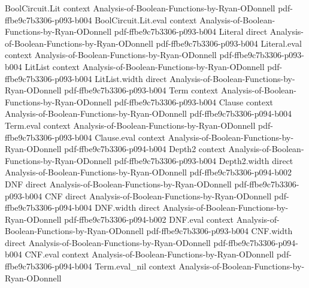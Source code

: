 \begin{lemma}
\label{BoolBLR.fourier_coeff_le_of_dist_ge_aux_h_lift_pm1}
\leanok
{}
\proofstep
  {BoolCircuit.Lit}
  {context}
  {Analysis-of-Boolean-Functions-by-Ryan-ODonnell}
  {pdf-ffbe9c7b3306-p093-b004}
\proofstep
  {BoolCircuit.Lit.eval}
  {context}
  {Analysis-of-Boolean-Functions-by-Ryan-ODonnell}
  {pdf-ffbe9c7b3306-p093-b004}
\proofstep
  {Literal}
  {direct}
  {Analysis-of-Boolean-Functions-by-Ryan-ODonnell}
  {pdf-ffbe9c7b3306-p093-b004}
\proofstep
  {Literal.eval}
  {context}
  {Analysis-of-Boolean-Functions-by-Ryan-ODonnell}
  {pdf-ffbe9c7b3306-p093-b004}
\proofstep
  {LitList}
  {context}
  {Analysis-of-Boolean-Functions-by-Ryan-ODonnell}
  {pdf-ffbe9c7b3306-p093-b004}
\proofstep
  {LitList.width}
  {direct}
  {Analysis-of-Boolean-Functions-by-Ryan-ODonnell}
  {pdf-ffbe9c7b3306-p093-b004}
\proofstep
  {Term}
  {context}
  {Analysis-of-Boolean-Functions-by-Ryan-ODonnell}
  {pdf-ffbe9c7b3306-p093-b004}
\proofstep
  {Clause}
  {context}
  {Analysis-of-Boolean-Functions-by-Ryan-ODonnell}
  {pdf-ffbe9c7b3306-p094-b004}
\proofstep
  {Term.eval}
  {context}
  {Analysis-of-Boolean-Functions-by-Ryan-ODonnell}
  {pdf-ffbe9c7b3306-p093-b004}
\proofstep
  {Clause.eval}
  {context}
  {Analysis-of-Boolean-Functions-by-Ryan-ODonnell}
  {pdf-ffbe9c7b3306-p094-b004}
\proofstep
  {Depth2}
  {context}
  {Analysis-of-Boolean-Functions-by-Ryan-ODonnell}
  {pdf-ffbe9c7b3306-p093-b004}
\proofstep
  {Depth2.width}
  {direct}
  {Analysis-of-Boolean-Functions-by-Ryan-ODonnell}
  {pdf-ffbe9c7b3306-p094-b002}
\proofstep
  {DNF}
  {direct}
  {Analysis-of-Boolean-Functions-by-Ryan-ODonnell}
  {pdf-ffbe9c7b3306-p093-b004}
\proofstep
  {CNF}
  {direct}
  {Analysis-of-Boolean-Functions-by-Ryan-ODonnell}
  {pdf-ffbe9c7b3306-p094-b004}
\proofstep
  {DNF.width}
  {direct}
  {Analysis-of-Boolean-Functions-by-Ryan-ODonnell}
  {pdf-ffbe9c7b3306-p094-b002}
\proofstep
  {DNF.eval}
  {context}
  {Analysis-of-Boolean-Functions-by-Ryan-ODonnell}
  {pdf-ffbe9c7b3306-p093-b004}
\proofstep
  {CNF.width}
  {direct}
  {Analysis-of-Boolean-Functions-by-Ryan-ODonnell}
  {pdf-ffbe9c7b3306-p094-b004}
\proofstep
  {CNF.eval}
  {context}
  {Analysis-of-Boolean-Functions-by-Ryan-ODonnell}
  {pdf-ffbe9c7b3306-p094-b004}
\proofstep
  {Term.eval_nil}
  {context}
  {Analysis-of-Boolean-Functions-by-Ryan-ODonnell}

\end{lemma}
